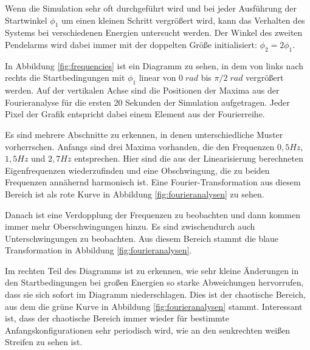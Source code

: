 Wenn die Simulation sehr oft durchgeführt wird und bei jeder Ausführung der Startwinkel $\phi_1$ um einen kleinen Schritt vergrößert wird, kann das Verhalten des Systems bei verschiedenen Energien untersucht werden.
Der Winkel des zweiten Pendelarms wird dabei immer mit der doppelten Größe initialisiert: $\phi_2 = 2\phi_1$.

In Abbildung \ref{fig:frequencies} ist ein Diagramm zu sehen, in dem von links nach rechts die Startbedingungen mit $\phi_1$ linear von $0\;rad$ bis $\pi/2\;rad$ vergrößert werden.
Auf der vertikalen Achse sind die Positionen der Maxima aus der Fourieranalyse für die ersten 20 Sekunden der Simulation aufgetragen.
Jeder Pixel der Grafik entspricht dabei einem Element aus der Fourierreihe.

Es sind mehrere Abschnitte zu erkennen, in denen unterschiedliche Muster vorherrschen.
Anfangs sind drei Maxima vorhanden, die den Frequenzen $0,5 Hz$, $1,5 Hz$ und $2,7 Hz$ entsprechen.
Hier sind die aus der Linearisierung berechneten Eigenfrequenzen wiederzufinden und eine Obschwingung, die zu beiden Frequenzen annähernd harmonisch ist.
Eine Fourier-Transformation aus diesem Bereich ist als rote Kurve in Abbildung \ref{fig:fourieranalysen} zu sehen.

Danach ist eine Verdopplung der Frequenzen zu beobachten und dann kommen immer mehr Oberschwingungen hinzu.
Es sind zwischendurch auch Unterschwingungen zu beobachten.
Aus diesem Bereich stammt die blaue Transformation in Abbildung \ref{fig:fourieranalysen}.

Im rechten Teil des Diagramms ist zu erkennen, wie sehr kleine Änderungen in den Startbedingungen bei großen Energien so starke Abweichungen hervorrufen, dass sie sich sofort im Diagramm niederschlagen.
Dies ist der chaotische Bereich, aus dem die grüne Kurve in Abbildung \ref{fig:fourieranalysen} stammt.
Interessant ist, dass der chaotische Bereich immer wieder für bestimmte Anfangskonfigurationen sehr periodisch wird, wie an den senkrechten weißen Streifen zu sehen ist.

